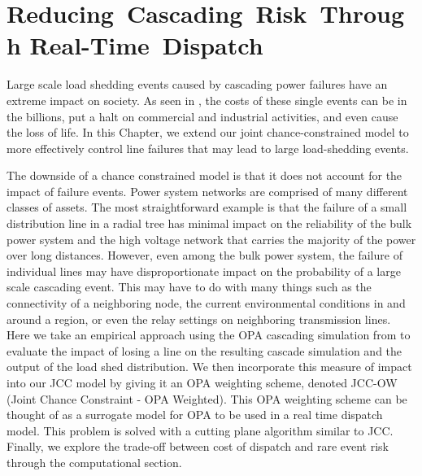 \newcommand{\mypathoj}{../thesis/oj}

\newcommand{\mypathojdata}{../thesis/oj/data}
\newcommand{\alert}[1]{#1}
\chapter{Reducing~Cascading~Risk~Through  Real-Time~Dispatch}\label{ch:jccow}

Large scale load shedding events caused by cascading power failures have an extreme impact on society.  As seen in , the costs of these single events can be in the billions, put a halt on commercial and industrial activities, and even cause the loss of life.  In this Chapter, we extend our joint chance-constrained model to more effectively control line failures that may lead to large load-shedding events.


The downside of a chance constrained model is that it does not account for the impact of failure events.  Power system networks are comprised of many different classes of assets.  The most straightforward example is that the failure of a small distribution line in a radial tree has minimal impact on the reliability of the bulk power system and the high voltage network that carries the majority of the power over long distances.  However, even among the bulk power system, the failure of individual lines may have disproportionate impact on the probability of a large scale cascading event.  This may have to do with many things such as the connectivity of a neighboring node, the current environmental conditions in and around a region, or even the relay settings on neighboring transmission lines.  Here we take an empirical approach using the OPA cascading simulation from  to evaluate the impact of losing a line on the resulting cascade simulation and the output of the load shed distribution.  We then incorporate this measure of impact into our JCC model by giving it an OPA weighting scheme, denoted JCC-OW (Joint Chance Constraint - OPA Weighted).  This OPA weighting scheme can be thought of as a surrogate model for OPA to be used in a real time dispatch model.  This problem is solved with a cutting plane algorithm similar to JCC.  Finally, we explore the trade-off between cost of dispatch and rare event risk through the computational section.




